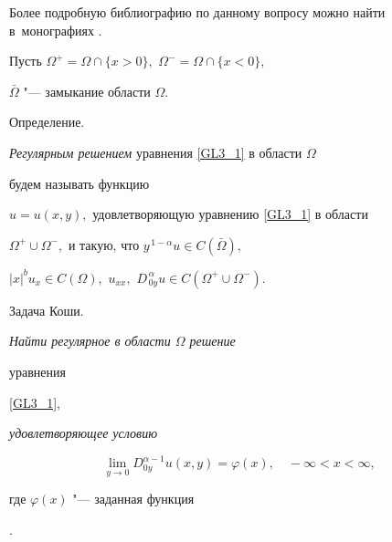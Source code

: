 Более подробную библиографию по данному вопросу можно найти в~монографиях \cite{Pskhu, MathaiSaxenaHaubold, Podlubny}.

 





\smallskip






Пусть $\Omega^{+}=\Omega\cap\{x>0 \},$ $\Omega^{-}=\Omega\cap\{x<0\},$ 

$\bar{\Omega}$ "--- замыкание области $\Omega.$ 



\smallskip



{\sc\small Определение.}

{\it Регулярным  решением} уравнения \eqref{GL3_1} в области $\Omega$ 

будем называть функцию

$u=u(x,y),$ удовлетворяющую уравнению \eqref{GL3_1} в области

$\Omega^{+}\cup\Omega^{-},$ и такую, что $y^{\,1-\alpha}u\in{C(\bar{\Omega})},$ 

$|x|^b u_{x}\in{C(\Omega)},$ $u_{xx},$ $D_{\,0y}^{\,\alpha} u\in{C(\Omega^{+}\cup\Omega^{-})}.$



\smallskip



{\sc\small Задача Коши.}

{\it Найти регулярное в области $\Omega$ решение

уравнения} \eqref{GL3_1}, {\it удовлетворяющее условию

\begin{equation}\label{UslSMCoshi}

\lim\limits_{y \rightarrow 0} D_{0y}^{\alpha-1}u(x,y)=\varphi(x), \quad  -\infty<x<\infty,

\end{equation}

где $\varphi(x)$ "--- заданная функция}.



\smallskip



